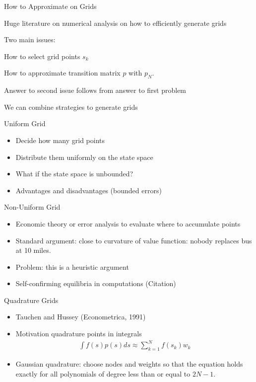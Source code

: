 \documentclass[xcolor=pdftex,dvipsnames,table,mathserif,aspectratio=169]{beamer}
\begin{document}
\begin{frame}{How to Approximate on Grids}
\begin{outline}
\item Huge literature on numerical analysis on how to efficiently generate grids
\item Two main issues:
\begin{outline}
\item How to select grid points $s_k$
\item How to approximate transition matrix $p$ with $p_N$.
\end{outline}
\item Answer to second issue follows from answer to first problem
\item We can combine strategies to generate grids
\end{outline}
\end{frame}

\begin{frame}{Uniform Grid}
\begin{itemize}
\item Decide how many grid points
\item Distribute them uniformly on the state space
\item What if the state space is unbounded?
\item Advantages and disadvantages (bounded errors)
\end{itemize}
\end{frame}


\begin{frame}{Non-Uniform Grid}
\begin{itemize}
\item Economic theory or error analysis to evaluate where to accumulate points
\item Standard argument: close to curvature of value function: nobody replaces bus at 10 miles.
\item Problem: this is a heuristic argument
\item Self-confirming equilibria in computations (Citation)
\end{itemize}
\end{frame}

\begin{frame}{Quadrature Grids}
\begin{itemize}
\item Tauchen and Hussey (Econometrica, 1991)
\item Motivation quadrature points in integrals
\begin{eqnarray*}
\int f(s) p(s) d s \approx \sum_{k=1}^N f(s_k) w_k
\end{eqnarray*}
\item Gaussian quadrature: choose nodes and weights so that the equation holds exactly for all polynomials of degree less than or equal to $2N -1$.
\end{itemize}
\end{frame}
\end{document}
